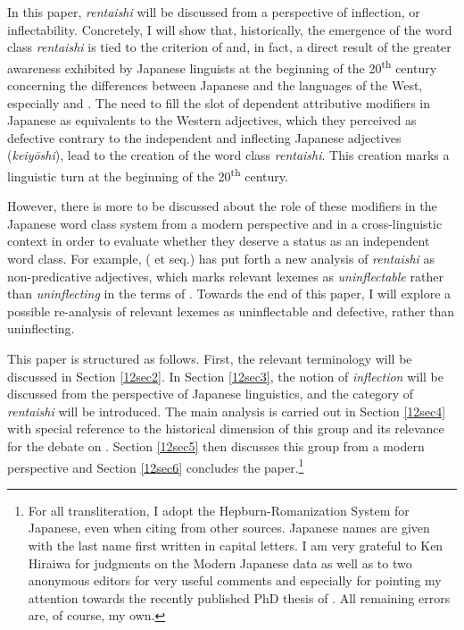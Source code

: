 \documentclass[output=paper,colorlinks,citecolor=brown]{langscibook}
\begin{document}
In this paper, \emph{rentaishi} will be discussed from a perspective of inflection, or inflectability. Concretely, I will show that, historically, the emergence of the word class \emph{rentaishi} is tied to the criterion of  and, in fact, a direct result of the greater awareness exhibited by Japanese linguists at the beginning of the 20\textsuperscript{th} century concerning the differences between Japanese and the languages of the West, especially  and . The need to fill the slot of dependent attributive modifiers in Japanese as equivalents to the Western adjectives, which they perceived as defective contrary to the independent and inflecting Japanese adjectives (\emph{keiyōshi}), lead to the creation of the word class \emph{rentaishi}. This creation marks a linguistic turn at the beginning of the 20\textsuperscript{th} century.

However, there is more to be discussed about the role of these modifiers in the Japanese word class system from a modern perspective and in a cross-linguistic context in order to evaluate whether they deserve a status as an independent word class. For example, \citeauthor{muraki1996} (\citeyear{muraki1996} et seq.) has put forth a new analysis of \emph{rentaishi} as non-predicative adjectives, which marks relevant lexemes as \emph{uninflectable} rather than \emph{uninflecting} in the terms of \citet{spencer2020}. Towards the end of this paper, I will explore a possible re-analysis of relevant lexemes as uninflectable and defective, rather than uninflecting.

This paper is structured as follows. First, the relevant terminology will be discussed in Section \ref{12sec2}. In Section \ref{12sec3}, the notion of \emph{inflection} will be discussed from the perspective of Japanese linguistics, and the category of \emph{rentaishi} will be introduced. The main analysis is carried out in Section \ref{12sec4} with special reference to the historical dimension of this group and its relevance for the debate on \emph{}. Section \ref{12sec5} then discusses this group from a modern perspective and Section \ref{12sec6} concludes the paper.\footnote{For all transliteration, I adopt the Hepburn-Romanization System for Japanese, even when citing from other sources. Japanese names are given with the last name first written in capital letters. I am very grateful to Ken Hiraiwa for judgments on the Modern Japanese data as well as to two anonymous editors for very useful comments and especially for pointing my attention towards the recently published PhD thesis of \citet{nespoli2023}. All remaining errors are, of course, my own.}
\end{document}
